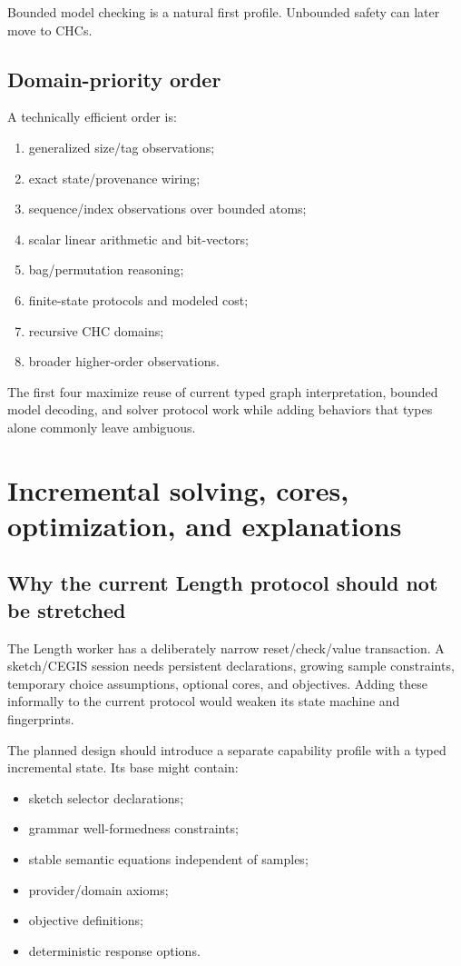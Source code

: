 \documentclass[10pt,letterpaper,oneside]{report}
\begin{document}
Bounded model checking is a natural first profile. Unbounded safety can later move to CHCs.

\section{Domain-priority order}

A technically efficient order is:

\begin{enumerate}
\item generalized size/tag observations;
\item exact state/provenance wiring;
\item sequence/index observations over bounded atoms;
\item scalar linear arithmetic and bit-vectors;
\item bag/permutation reasoning;
\item finite-state protocols and modeled cost;
\item recursive CHC domains;
\item broader higher-order observations.
\end{enumerate}

The first four maximize reuse of current typed graph interpretation, bounded model decoding, and solver protocol work while adding behaviors that types alone commonly leave ambiguous.

\chapter{Incremental solving, cores, optimization, and explanations}
\label{chap:future-protocol}

\section{Why the current Length protocol should not be stretched}

The Length worker has a deliberately narrow reset/check/value transaction. A sketch/CEGIS session needs persistent declarations, growing sample constraints, temporary choice assumptions, optional cores, and objectives. Adding these informally to the current protocol would weaken its state machine and fingerprints.

The planned design should introduce a separate capability profile with a typed incremental state. Its base might contain:

\begin{itemize}
\item sketch selector declarations;
\item grammar well-formedness constraints;
\item stable semantic equations independent of samples;
\item provider/domain axioms;
\item objective definitions;
\item deterministic response options.
\end{itemize}
\end{document}

